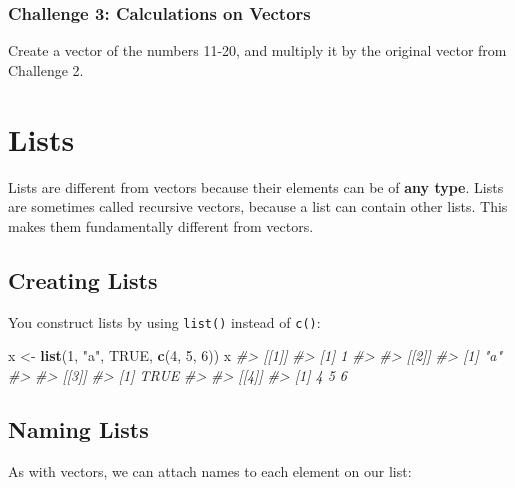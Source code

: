 \documentclass[]{book}
\newenvironment{Shaded}{\begin{snugshade}}{\end{snugshade}}
\newcommand{\CommentTok}[1]{\textcolor[rgb]{0.56,0.35,0.01}{\textit{#1}}}
\newcommand{\DecValTok}[1]{\textcolor[rgb]{0.00,0.00,0.81}{#1}}
\newcommand{\KeywordTok}[1]{\textcolor[rgb]{0.13,0.29,0.53}{\textbf{#1}}}
\newcommand{\NormalTok}[1]{#1}
\newcommand{\OtherTok}[1]{\textcolor[rgb]{0.56,0.35,0.01}{#1}}
\newcommand{\StringTok}[1]{\textcolor[rgb]{0.31,0.60,0.02}{#1}}
\begin{document}
\hypertarget{challenge-3-calculations-on-vectors}{%
\subsubsection*{Challenge 3: Calculations on Vectors}\label{challenge-3-calculations-on-vectors}}

Create a vector of the numbers 11-20, and multiply it by the original vector from Challenge 2.

\hypertarget{lists}{%
\section{Lists}\label{lists}}

Lists are different from vectors because their elements can be of \textbf{any type}. Lists are sometimes called recursive vectors, because a list can contain other lists. This makes them fundamentally different from vectors.

\hypertarget{creating-lists}{%
\subsection{Creating Lists}\label{creating-lists}}

You construct lists by using \texttt{list()} instead of \texttt{c()}:

\begin{Shaded}
\begin{Highlighting}[]
\NormalTok{x <-}\StringTok{ }\KeywordTok{list}\NormalTok{(}\DecValTok{1}\NormalTok{, }\StringTok{"a"}\NormalTok{, }\OtherTok{TRUE}\NormalTok{, }\KeywordTok{c}\NormalTok{(}\DecValTok{4}\NormalTok{, }\DecValTok{5}\NormalTok{, }\DecValTok{6}\NormalTok{))}
\NormalTok{x}
\CommentTok{#> [[1]]}
\CommentTok{#> [1] 1}
\CommentTok{#> }
\CommentTok{#> [[2]]}
\CommentTok{#> [1] "a"}
\CommentTok{#> }
\CommentTok{#> [[3]]}
\CommentTok{#> [1] TRUE}
\CommentTok{#> }
\CommentTok{#> [[4]]}
\CommentTok{#> [1] 4 5 6}
\end{Highlighting}
\end{Shaded}

\hypertarget{naming-lists}{%
\subsection{Naming Lists}\label{naming-lists}}

As with vectors, we can attach names to each element on our list:
\end{document}
